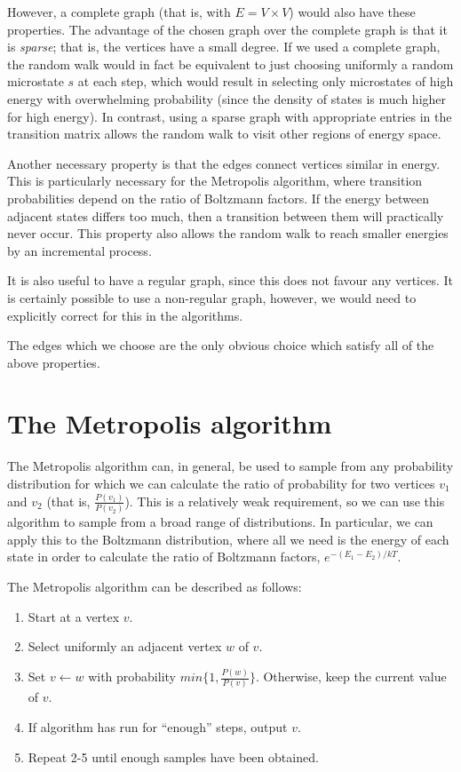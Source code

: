 \documentclass{article}
\begin{document}
However, a complete graph (that is, with $E = V\times V$) would also have these properties.
The advantage of the chosen graph over the complete graph is that it is \emph{sparse}; that is, the vertices have a small degree.
If we used a complete graph, the random walk would in fact be equivalent to just choosing uniformly a random microstate $s$ at each step, which would result in selecting only microstates of high energy with overwhelming probability (since the density of states is much higher for high energy).
In contrast, using a sparse graph with appropriate entries in the transition matrix allows the random walk to visit other regions of energy space.

Another necessary property is that the edges connect vertices similar in energy.
This is particularly necessary for the Metropolis algorithm, where transition probabilities depend on the ratio of Boltzmann factors.
If the energy between adjacent states differs too much, then a transition between them will practically never occur.
This property also allows the random walk to reach smaller energies by an incremental process.

It is also useful to have a regular graph, since this does not favour any vertices.
It is certainly possible to use a non-regular graph, however, we would need to explicitly correct for this in the algorithms.

The edges which we choose are the only obvious choice which satisfy all of the above properties.

\section{The Metropolis algorithm}
The Metropolis algorithm can, in general, be used to sample from any probability distribution for which we can calculate the ratio of probability for two vertices $v_1$ and $v_2$ (that is, $\frac{P(v_1)}{P(v_2)}$).
This is a relatively weak requirement, so we can use this algorithm to sample from a broad range of distributions.
In particular, we can apply this to the Boltzmann distribution, where all we need is the energy of each state in order to calculate the ratio of Boltzmann factors, $e^{-(E_1-E_2)/kT}$.

The Metropolis algorithm can be described as follows:
\begin{enumerate}
    \item Start at a vertex $v$.
    \item Select uniformly an adjacent vertex $w$ of $v$.
    \item Set $v \leftarrow w$ with probability $min\{1, \frac{P(w)}{P(v)}\}$. Otherwise, keep the current value of $v$.
    \item If algorithm has run for ``enough'' steps, output $v$.
    \item Repeat 2-5 until enough samples have been obtained.
\end{enumerate}
\end{document}
